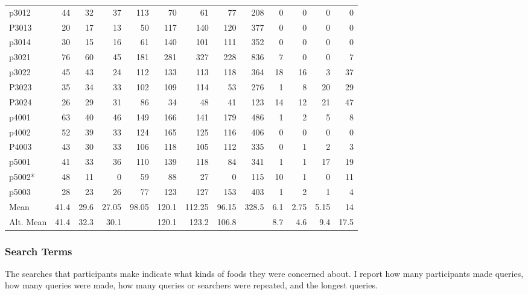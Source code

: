 \begin{table}[htbp]
\begin{tabular}{lrrrrrrrrrrrr}
    p3012 & 44    & 32    & 37    & 113   & 70    & 61    & 77    & 208   & 0     & 0     & 0     & 0 \\
    P3013 & 20    & 17    & 13    & 50    & 117   & 140   & 120   & 377   & 0     & 0     & 0     & 0 \\
    p3014 & 30    & 15    & 16    & 61    & 140   & 101   & 111   & 352   & 0     & 0     & 0     & 0 \\
    p3021 & 76    & 60    & 45    & 181   & 281   & 327   & 228   & 836   & 7     & 0     & 0     & 7 \\
    p3022 & 45    & 43    & 24    & 112   & 133   & 113   & 118   & 364   & 18    & 16    & 3     & 37 \\
    P3023 & 35    & 34    & 33    & 102   & 109   & 114   & 53    & 276   & 1     & 8     & 20    & 29 \\
    P3024 & 26    & 29    & 31    & 86    & 34    & 48    & 41    & 123   & 14    & 12    & 21    & 47 \\
    p4001 & 63    & 40    & 46    & 149   & 166   & 141   & 179   & 486   & 1     & 2     & 5     & 8 \\
    p4002 & 52    & 39    & 33    & 124   & 165   & 125   & 116   & 406   & 0     & 0     & 0     & 0 \\
    P4003 & 43    & 30    & 33    & 106   & 118   & 105   & 112   & 335   & 0     & 1     & 2     & 3 \\
    p5001 & 41    & 33    & 36    & 110   & 139   & 118   & 84    & 341   & 1     & 1     & 17    & 19 \\
    p5002* & 48    & 11    & 0     & 59    & 88    & 27    & 0     & 115   & 10    & 1     & 0     & 11 \\
    p5003 & 28    & 23    & 26    & 77    & 123   & 127   & 153   & 403   & 1     & 2     & 1     & 4 \\
\midrule
    Mean  & 41.4  & 29.6  & 27.05 & 98.05 & 120.1 & 112.25 & 96.15 & 328.5 & 6.1   & 2.75  & 5.15  & 14 \\
    Alt. Mean & 41.4  & 32.3  & 30.1  &       & 120.1 & 123.2 & 106.8 &       & 8.7   & 4.6   & 9.4   & 17.5 \\

    \bottomrule
    \end{tabular}%
  \label{tab:strategy_table}%
\end{table}%


\subsubsection{Search Terms}
The searches that participants make indicate what kinds of foods they were concerned about. I report how many participants made queries, how many queries were made, how many queries or searchers were repeated, and the longest queries. 

